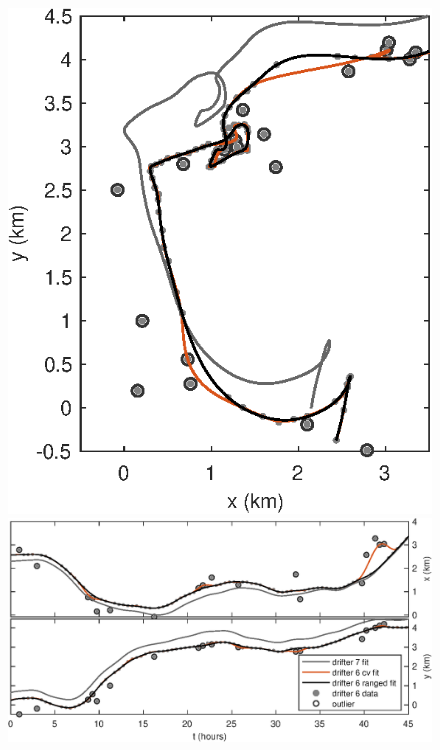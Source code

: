 \documentclass{ametsoc}
\begin{document}
\begin{figure}[t]
  \centering
    \begin{minipage}{0.30\textwidth}
        \centering
        \includegraphics[width=1.0\textwidth]{gpsfit_xy.eps} %
    \end{minipage}\hfill
    \begin{minipage}{0.7\textwidth}
        \centering
        \includegraphics[width=1.0\textwidth]{gpsfit_xtyt.eps} %

\end{minipage}
\end{figure}
\end{document}
